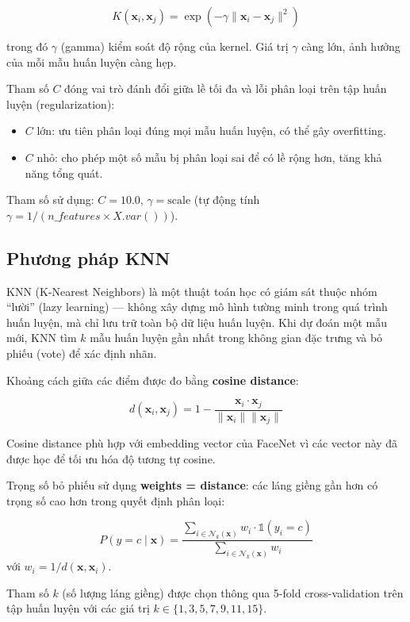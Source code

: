 \documentclass[12pt,a4paper]{article}
\begin{document}
\[
K(\mathbf{x}_i, \mathbf{x}_j) = \exp\left(-\gamma \|\mathbf{x}_i - \mathbf{x}_j\|^2\right)
\]

trong đó $\gamma$ (gamma) kiểm soát độ rộng của kernel. Giá trị $\gamma$ càng lớn, ảnh hưởng của mỗi mẫu huấn luyện càng hẹp.

Tham số $C$ đóng vai trò đánh đổi giữa lề tối đa và lỗi phân loại trên tập huấn luyện (regularization):
\begin{itemize}
    \item $C$ lớn: ưu tiên phân loại đúng mọi mẫu huấn luyện, có thể gây overfitting.
    \item $C$ nhỏ: cho phép một số mẫu bị phân loại sai để có lề rộng hơn, tăng khả năng tổng quát.
\end{itemize}

Tham số sử dụng: $C = 10.0$, $\gamma = \text{scale}$ (tự động tính $\gamma = 1 / (n\_features \times X.var())$).

\subsection{Phương pháp KNN}
\label{subsec:knn_method}

KNN (K-Nearest Neighbors) là một thuật toán học có giám sát thuộc nhóm ``lười'' (lazy learning) --- không xây dựng mô hình tường minh trong quá trình huấn luyện, mà chỉ lưu trữ toàn bộ dữ liệu huấn luyện. Khi dự đoán một mẫu mới, KNN tìm $k$ mẫu huấn luyện gần nhất trong không gian đặc trưng và bỏ phiếu (vote) để xác định nhãn.

Khoảng cách giữa các điểm được đo bằng \textbf{cosine distance}:

\[
d(\mathbf{x}_i, \mathbf{x}_j) = 1 - \frac{\mathbf{x}_i \cdot \mathbf{x}_j}{\|\mathbf{x}_i\| \|\mathbf{x}_j\|}
\]

Cosine distance phù hợp với embedding vector của FaceNet vì các vector này đã được học để tối ưu hóa độ tương tự cosine.

Trọng số bỏ phiếu sử dụng \textbf{weights = distance}: các láng giềng gần hơn có trọng số cao hơn trong quyết định phân loại:

\[
P(y = c \mid \mathbf{x}) = \frac{\sum_{i \in \mathcal{N}_k(\mathbf{x})} w_i \cdot \mathbb{1}(y_i = c)}{\sum_{i \in \mathcal{N}_k(\mathbf{x})} w_i}
\]
với $w_i = 1 / d(\mathbf{x}, \mathbf{x}_i)$.

Tham số $k$ (số lượng láng giềng) được chọn thông qua 5-fold cross-validation trên tập huấn luyện với các giá trị $k \in \{1, 3, 5, 7, 9, 11, 15\}$.
\end{document}
